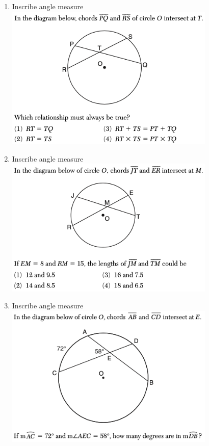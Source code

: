 \documentclass[12pt, oneside]{article}
\begin{document}
\begin{enumerate}[itemsep=1.2cm]
\item Inscribe angle measure\\
\includegraphics[width=10cm]{R-2images/R-2chordsE.png}
\vspace{1cm}

\item Inscribe angle measure\\
\includegraphics[width=10cm]{R-2images/R-2chordsF.png}
\vspace{1cm}

\item Inscribe angle measure\\
\includegraphics[width=10cm]{R-2images/R-2chordsH.png}
\vspace{1cm}


\end{enumerate}
\end{document}
